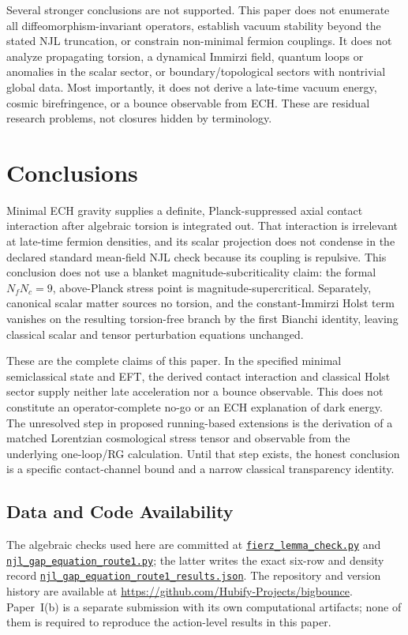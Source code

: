 \documentclass[aps,prd,twocolumn,superscriptaddress,showpacs,preprintnumbers,nofootinbib,longbibliography,floatfix]{revtex4-2}
\newcommand{\artifactnamed}[2]{\href{https://github.com/Hubify-Projects/bigbounce/blob/main/#1}{\nolinkurl{#2}}}
\begin{document}
Several stronger conclusions are not supported.  This paper does not
enumerate all diffeomorphism-invariant operators, establish vacuum stability
beyond the stated NJL truncation, or constrain non-minimal fermion couplings.
It does not analyze propagating torsion, a dynamical Immirzi field, quantum
loops or anomalies in the scalar sector, or boundary/topological sectors with
nontrivial global data.  Most importantly, it does not derive a late-time
vacuum energy, cosmic birefringence, or a bounce observable from ECH.  These
are residual research problems, not closures hidden by terminology.

\section{Conclusions}\label{sec:conclusions}

Minimal ECH gravity supplies a definite, Planck-suppressed axial contact
interaction after algebraic torsion is integrated out.  That interaction is
irrelevant at late-time fermion densities, and its scalar projection does not
condense in the declared standard mean-field NJL check because its coupling is
repulsive.  This conclusion does not use a blanket magnitude-subcriticality
claim: the formal $N_fN_c=9$, above-Planck stress point is
magnitude-supercritical.  Separately, canonical
scalar matter sources no torsion, and the constant-Immirzi Holst term vanishes
on the resulting torsion-free branch by the first Bianchi identity, leaving
classical scalar and tensor perturbation equations unchanged.

These are the complete claims of this paper.  In the specified minimal
semiclassical state and EFT, the derived contact interaction and classical
Holst sector supply neither late acceleration nor a bounce observable.  This
does not constitute an operator-complete no-go or an ECH explanation of dark
energy.  The unresolved
step in proposed running-based extensions is the derivation of a matched
Lorentzian cosmological stress tensor and observable from the underlying
one-loop/RG calculation.  Until that step exists, the honest conclusion is a
specific contact-channel bound and a narrow classical transparency identity.

\subsection*{Data and Code Availability}

The algebraic checks used here are committed at
\artifactnamed{arxiv/scripts/fierz_lemma_check.py}{fierz_lemma_check.py} and
\artifactnamed{arxiv/scripts/njl_gap_equation_route1.py}{njl_gap_equation_route1.py}; the latter writes the
exact six-row and density record
\artifactnamed{arxiv/scripts/njl_gap_equation_route1_results.json}{njl_gap_equation_route1_results.json}.  The repository and
version history are available at
\url{https://github.com/Hubify-Projects/bigbounce}.  Paper~I(b) is a separate
submission with its own computational artifacts; none of them is required to
reproduce the action-level results in this paper.
\end{document}
